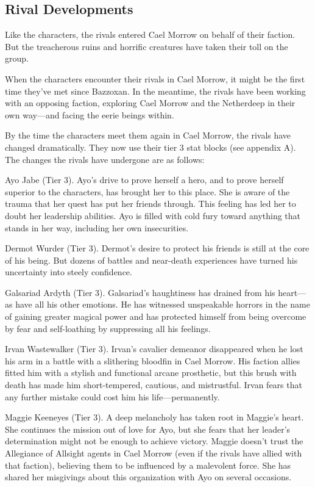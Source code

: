 \documentclass[10pt,a4paper,twoside,twocolumn,openany,nodeprecatedcode]{dndbook}
\begin{document}
\subsection{Rival Developments}
Like the characters, the rivals entered Cael Morrow on behalf of their faction. But the treacherous ruins and horrific creatures have taken their toll on the group.

When the characters encounter their rivals in Cael Morrow, it might be the first time they've met since Bazzoxan. In the meantime, the rivals have been working with an opposing faction, exploring Cael Morrow and the Netherdeep in their own way—and facing the eerie beings within.

By the time the characters meet them again in Cael Morrow, the rivals have changed dramatically. They now use their tier 3 stat blocks (see appendix A). The changes the rivals have undergone are as follows:

Ayo Jabe (Tier 3). Ayo's drive to prove herself a hero, and to prove herself superior to the characters, has brought her to this place. She is aware of the trauma that her quest has put her friends through. This feeling has led her to doubt her leadership abilities. Ayo is filled with cold fury toward anything that stands in her way, including her own insecurities.

Dermot Wurder (Tier 3). Dermot's desire to protect his friends is still at the core of his being. But dozens of battles and near-death experiences have turned his uncertainty into steely confidence.

Galsariad Ardyth (Tier 3). Galsariad's haughtiness has drained from his heart—as have all his other emotions. He has witnessed unspeakable horrors in the name of gaining greater magical power and has protected himself from being overcome by fear and self-loathing by suppressing all his feelings.

Irvan Wastewalker (Tier 3). Irvan's cavalier demeanor disappeared when he lost his arm in a battle with a slithering bloodfin in Cael Morrow. His faction allies fitted him with a stylish and functional arcane prosthetic, but this brush with death has made him short-tempered, cautious, and mistrustful. Irvan fears that any further mistake could cost him his life—permanently.

Maggie Keeneyes (Tier 3). A deep melancholy has taken root in Maggie's heart. She continues the mission out of love for Ayo, but she fears that her leader's determination might not be enough to achieve victory. Maggie doesn't trust the Allegiance of Allsight agents in Cael Morrow (even if the rivals have allied with that faction), believing them to be influenced by a malevolent force. She has shared her misgivings about this organization with Ayo on several occasions.
\end{document}
